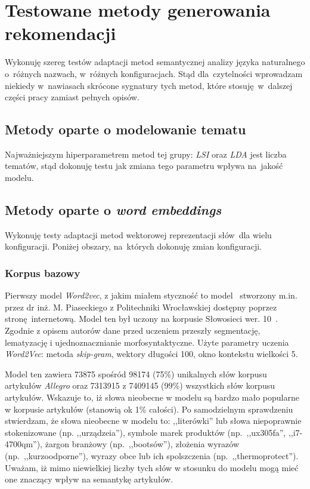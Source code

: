\documentclass[pl]{minipw} %
\begin{document}
\section{Testowane metody generowania rekomendacji}

Wykonuję szereg testów adaptacji metod semantycznej analizy języka naturalnego o~różnych nazwach, w~różnych konfiguracjach. Stąd dla~czytelności wprowadzam niekiedy w~nawiasach skrócone sygnatury tych metod, które stosuję w~dalszej części pracy zamiast pełnych opisów.

\subsection{Metody oparte o modelowanie tematu}

Najważniejszym hiperparametrem metod tej grupy: \textit{LSI} oraz \textit{LDA} jest liczba tematów, stąd dokonuję testu jak zmiana tego parametru wpływa na~jakość modelu.

\subsection{Metody oparte o \textit{word embeddings}}
Wykonuję testy adaptacji metod wektorowej reprezentacji słów~dla wielu konfiguracji. Poniżej obszary, na~których dokonuję zmian konfiguracji.

\subsubsection{Korpus bazowy}

Pierwszy model \textit{Word2vec}, z jakim miałem styczność to model~\cite{pias} stworzony m.in. przez dr inż. M. Piaseckiego z Politechniki Wrocławskiej dostępny poprzez stronę internetową. Model ten był uczony na korpusie Słowosieci wer. 10~\cite{wordnet}. Zgodnie z opisem autorów dane przed uczeniem  przeszły segmentację, lematyzację i ujednoznacznianie morfosyntaktyczne. Użyte parametry uczenia \textit{Word2Vec}: metoda \textit{skip-gram}, wektory długości 100, okno kontekstu wielkości 5.

Model ten zawiera 73875 spośród 98174 (75\%) unikalnych słów korpusu artykułów \textit{Allegro} oraz 7313915 z 7409145 (99\%) wszystkich słów korpusu artykułów. Wskazuje to, iż słowa nieobecne w modelu są bardzo mało popularne w korpusie artykułów (stanowią ok 1\% całości). Po samodzielnym sprawdzeniu stwierdzam, że słowa nieobecne w modelu to: ,,literówki'' lub słowa niepoprawnie stokenizowane (np. ,,urządzeia''), symbole marek produktów (np.~,,ux305fa'', ,,i7-4700qm''), żargon branżowy (np.~,,bootsów''), złożenia wyrazów (np.~,,kurzoodporne''), wyrazy obce lub ich spolszczenia (np.~,,thermoprotect''). Uważam, iż mimo niewielkiej liczby tych słów w stosunku do modelu mogą mieć one znaczący wpływ na semantykę artykułów.
\end{document}
